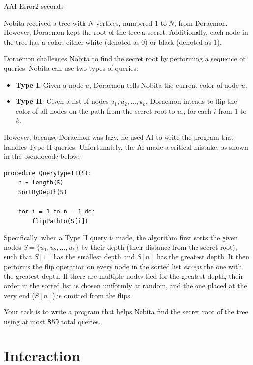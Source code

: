 \begin{problem}{A}{AI Error}{2 seconds}

\noindent
Nobita received a tree with $N$ vertices, numbered $1$ to $N$, from Doraemon. However, Doraemon kept the root of the tree a secret. Additionally, each node in the tree has a color: either white (denoted as $0$) or black (denoted as $1$). 

\noindent
Doraemon challenges Nobita to find the secret root by performing a sequence of queries. Nobita can use two types of queries:
\begin{itemize}
  \item \textbf{Type I}: Given a node $u$, Doraemon tells Nobita the current color of node $u$.
  \item \textbf{Type II}: Given a list of nodes $u_1, u_2, \dots, u_k$, Doraemon intends to flip the color of all nodes on the path from the secret root to $u_i$, for each $i$ from $1$ to $k$.
\end{itemize}

\noindent
However, because Doraemon was lazy, he used AI to write the program that handles Type II queries. Unfortunately, the AI made a critical mistake, as shown in the pseudocode below:

\begin{verbatim}
procedure QueryTypeII(S):
    n = length(S)
    SortByDepth(S) 
    
    for i = 1 to n - 1 do:
        flipPathTo(S[i])
\end{verbatim}

\noindent
Specifically, when a Type II query is made, the algorithm first sorts the given nodes $S = \{u_1, u_2, \dots, u_k\}$ by their depth (their distance from the secret root), such that $S[1]$ has the smallest depth and $S[n]$ has the greatest depth. It then performs the flip operation on every node in the sorted list \textit{except} the one with the greatest depth. If there are multiple nodes tied for the greatest depth, their order in the sorted list is chosen uniformly at random, and the one placed at the very end ($S[n]$) is omitted from the flips.

\noindent
Your task is to write a program that helps Nobita find the secret root of the tree using at most \textbf{850} total queries.

\section*{\sffamily Interaction}


\end{problem}
